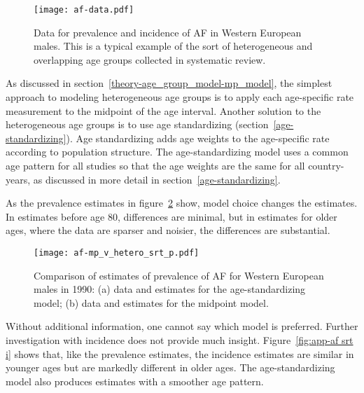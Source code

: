     \begin{figure}[h]
        \begin{center}
            \texttt{[image: af-data.pdf]}
            \caption[Data for prevalence and incidence of AF
              in Western European males]{Data for
              prevalence and incidence of AF in
              Western European males.  This is a typical example of
              the sort of heterogeneous and overlapping age groups
              collected in systematic review.}
            \label{fig:app-af data}
        \end{center}
    \end{figure}

As discussed in section~\ref{theory-age_group_model-mp_model},
the simplest approach to modeling heterogeneous age groups is to apply
each age-specific rate measurement to the midpoint of the age interval.
Another solution to the heterogeneous age groups is to use age standardizing
(section~\ref{age-standardizing}).  Age standardizing adds age weights to the age-specific rate according
to population structure.  The age-standardizing model uses a common
age pattern for all studies so that the age weights are the same for
all country-years, as discussed in more detail in section~\ref{age-standardizing}.

As the prevalence estimates in figure~\ref{fig:app-af srt p} show,
model choice changes the estimates.  In estimates before age 80,
differences are minimal, but in estimates for older ages, where the
data are sparser and noisier, the differences are substantial.

    \begin{figure}[h]
        \begin{center}
            \texttt{[image: af-mp\_v\_hetero\_srt\_p.pdf]}
            \caption[Comparison of estimates of prevalence of AF for
              Western European males in 1990 using an
              age-standardizing model and midpoint model]{Comparison
              of estimates of prevalence of AF for Western European
              males in 1990: (a) data and estimates for the
              age-standardizing model; (b) data and estimates for the
              midpoint model.}
            \label{fig:app-af srt p}
        \end{center}
    \end{figure}

Without additional information, one cannot say which model is preferred.
Further investigation with incidence does not provide much insight.
Figure~\ref{fig:app-af srt i} shows that, like the prevalence estimates, the
incidence estimates are similar in younger ages but are markedly different
in older ages.  The age-standardizing model also produces estimates with a
smoother age pattern.

